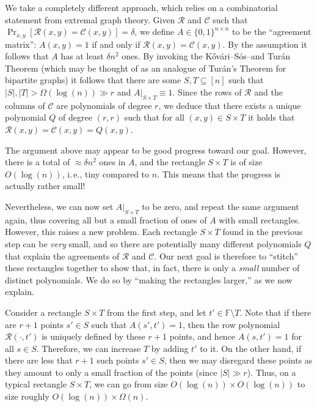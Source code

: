 \documentclass[11pt]{article}
\numberwithin{equation}{section}
\theoremstyle{definition}
\theoremstyle{plain}
\newcommand{\ie}{i.\,e.}
\theoremstyle{plain}
\newcommand{\colored}{}
\newcommand{\blocklength}{\colored{n}} %
\newcommand{\Field}{\colored{\mathbb F}}
\newcommand{\degree}{\colored{r}}
\newcommand{\rowpoly}{\colored{\mathcal R}}
\newcommand{\colpoly}{\colored{\mathcal C}}
\newcommand{\prox}{\colored{\delta}}
\newcommand\abs[1]{\colored{\left|#1\right|}}
\begin{document}
We take a completely different approach, which relies on a combinatorial statement from extremal graph theory. Given $\rowpoly$ and $\colpoly$ such that $\Pr_{x,y}[\rowpoly(x,y) = \colpoly(x,y)] = \prox$, we define $A \in \{0,1\}^{\blocklength \times \blocklength}$ to be the ``agreement matrix'': $A(x,y) = 1$ if and only if $\rowpoly(x,y) = \colpoly(x,y)$. By the assumption it follows that $A$ has at least $\prox \blocklength^2$ ones. By invoking the
%
K\H{o}v\'{a}ri--S\'{o}s--and Tur\'{a}n
Theorem (which may be thought of as an analogue of Tur\'{a}n's Theorem for bipartite graphs) it follows that there are some $S,T \subseteq [\blocklength]$ such that $\abs{S} , \abs{T} > \Omega(\log(\blocklength)) \gg \degree$ and $A\vert_{S \times T} \equiv 1$. Since the rows of $\rowpoly$ and the columns of $\colpoly$ are polynomials of degree $\degree$, we deduce that there exists a unique polynomial $Q$ of degree $(\degree,\degree)$ such that for all $(x,y) \in S \times T$ it holds that $\rowpoly(x,y) = \colpoly(x,y) = Q(x,y)$.

The argument above may appear to be good progress toward our goal. However, there is a total of $\approx \prox \blocklength^2$ ones in $A$, and the rectangle $S \times T$ is of size $O(\log(\blocklength))$, \ie, tiny compared to $\blocklength$. This means that the progress is actually rather small!

Nevertheless, we can now set $A\vert_{S \times T}$ to be zero, and repeat the same argument again, thus covering all but a small fraction of ones of $A$ with small rectangles. However, this raises a new problem. Each rectangle $S \times T$ found in the previous step can be \emph{very} small, and so there are potentially many different polynomials $Q$ that explain the agreements of $\rowpoly$ and $\colpoly$. Our next goal is therefore to ``stitch'' these rectangles together to show that, in fact, there is only a \emph{small} number of distinct polynomials. We do so by ``making the rectangles larger,'' as we now explain.

Consider a rectangle $S \times T$ from the first step, and let $t' \in \Field \setminus T$. Note that if there are $\degree+1$ points $s' \in S$ such that $A(s',t') =1$, then the row polynomial $\rowpoly( \cdot, t')$ is uniquely defined by these $\degree+1$ points, and hence $A(s,t') = 1$ for all $s \in S$. Therefore, we can increase $T$ by adding $t'$ to it. On the other hand, if there are less that $\degree+1$ such points $s'\in S$, then we may disregard these points as they amount to only a small fraction of the points (since $\abs{S} \gg \degree$). Thus, on a typical rectangle $S \times T$, we can go from size $O(\log(\blocklength)) \times O(\log(\blocklength)) $ to size roughly $O(\log(\blocklength)) \times \Omega(\blocklength)$.
\end{document}
